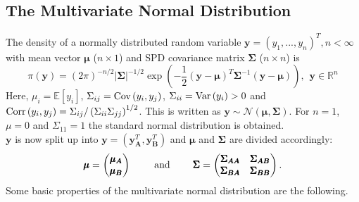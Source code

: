 \subsection{The Multivariate Normal Distribution}
The density of a normally distributed random variable $\pmb{y}=\left(y_1,...,y_n\right)^T, n<\infty$ with mean vector $\pmb{\mu}$ ($n\times1$) and SPD covariance matrix $\pmb{\Sigma}$ ($n\times n$) is
\begin{equation}
    \pi\left(\pmb{y}\right)=\left(2\pi\right)^{-n/2}|\pmb{\Sigma}|^{-1/2}\exp\left(-\frac{1}{2}\left(\pmb{y}-\pmb{\mu}\right)^T\pmb{\Sigma}^{-1}\left(\pmb{y}-\pmb{\mu}\right)\right),\hspace{5pt}\pmb{y}\in\mathbb{R}^n
\end{equation}
Here, $\mu_i=\mathbb{E}\left[y_i\right]$, $ \Sigma_{ij}=\hbox{Cov}\left(y_i,y_j\right)$, $ \Sigma_{ii}=\hbox{Var}\left(y_i\right) > 0$ and $\hbox{Corr}\left(y_i,y_j\right)=\Sigma_{ij}/\left(\Sigma_{ii}\Sigma_{jj}\right)^{1/2}$. This is written as $\pmb{y}\sim\mathcal{N}\left(\pmb{\mu},\pmb{\Sigma}\right)$. For $n=1$, $\mu=0$ and $\Sigma_{11}=1$ the standard normal distribution is obtained. \\
$\pmb{y}$ is now split up into $\pmb{y}=\left(\pmb{y}_{\pmb{A}}^T,\pmb{y}_{\pmb{B}}^T\right)$ and $\pmb{\mu}$ and $\pmb{\Sigma}$ are divided accordingly:
\begin{equation*}
    \pmb{\mu} = \begin{pmatrix}\pmb{\mu}_{\pmb{A}} \\ \pmb{\mu}_{\pmb{B}}\end{pmatrix} \hspace{20pt}\hbox{ and }\hspace{20pt} \pmb{\Sigma}=\begin{pmatrix}\pmb{\Sigma}_{\pmb{AA}} & \pmb{\Sigma}_{\pmb{AB}}\\\pmb{\Sigma}_{\pmb{BA}} & \pmb{\Sigma}_{\pmb{BB}}\end{pmatrix}.
\end{equation*}
Some basic properties of the multivariate normal distribution are the following.
